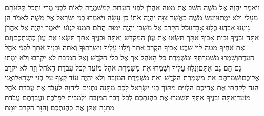 \documentclass[../main/main.tex]{subfiles}
\begin{document}
\begin{multicols*}{\ncols}
וַיֹּאמֶר יַהְוֶה אֶל מֹשֶׁה הָשֵׁב אֶת מַטֵּה אַהֲרֹן לִפְנֵי הָעֵדוּת לְמִשְׁמֶרֶת לְאוֹת לִבְנֵי מֶרִי וּתְכַל תְּלוּנֹּתָם מֵעָלַי וְלֹא יָמֻתוּ\PreVerseSpace{}וַיַּעַשׂ מֹשֶׁה כַּאֲשֶׁר צִוָּה יַהְוֶה אֹתוֹ כֵּן עָשָׂה \ClosedSection{}וַיֹּאמְרוּ בְּנֵי יִשְׂרָאֵל אֶל מֹשֶׁה לֵאמֹר הֵן גָּוַעְנוּ אָבַדְנוּ כֻּלָּנוּ אָבָדְנוּ\PreVerseSpace{}כֹּל הַקָּרֵב  אֶל מִשְׁכַּן יַהְוֶה יָמוּת הֲתֹם\SubEnd{} תַּמְנוּ לִגְוֺעַ \ClosedSection{}וַיֹּאמֶר יַהְוֶה אֶל אַהֲרֹן אַתָּה וּבָנֶיךָ וּבֵית אָבִיךָ אִתָּךְ תִּשְׂאוּ אֶת עֲוֺן הַמִּקְדָּשׁ וְאַתָּה וּבָנֶיךָ אִתָּךְ תִּשְׂאוּ אֶת עֲוֺן כְּהֻנַּתְכֶם\PreVerseSpace{}וְגַם אֶת אַחֶיךָ מַטֵּה לֵוִי שֵׁבֶט אָבִיךָ הַקְרֵב אִתָּךְ וְיִלָּווּ עָלֶיךָ וִישָׁרְתוּךָ וְאַתָּה וּבָנֶיךָ אִתָּךְ לִפְנֵי אֹהֶל הָעֵדֻת\PreVerseSpace{}וְשָׁמְרוּ מִשְׁמַרְתְּךָ וּמִשְׁמֶרֶת כָּל הָאֹהֶל אַךְ אֶל כְּלֵי הַקֹּדֶשׁ וְאֶל הַמִּזְבֵּחַ לֹא יִקְרָבוּ וְלֹא יָמֻתוּ גַם הֵם גַּם אַתֶּם\PreVerseSpace{}וְנִלְווּ עָלֶיךָ וְשָׁמְרוּ אֶת מִשְׁמֶרֶת אֹהֶל מוֹעֵד לְכֹל עֲבֹדַת הָאֹהֶל וְזָר לֹא יִקְרַב אֲלֵיכֶם\PreVerseSpace{}וּשְׁמַרְתֶּם אֵת מִשְׁמֶרֶת הַקֹּדֶשׁ וְאֵת מִשְׁמֶרֶת הַמִּזְבֵּחַ וְלֹא יִהְיֶה עוֹד קֶצֶף עַל בְּנֵי יִשְׂרָאֵל\PreVerseSpace{}וַאֲנִי הִנֵּה לָקַחְתִּי אֶת אֲחֵיכֶם הַלְוִיִּם מִתּוֹךְ בְּנֵי יִשְׂרָאֵל לָכֶם מַתָּנָה נְתֻנִים לַיהוָה לַעֲבֹד אֶת עֲבֹדַת אֹהֶל מוֹעֵד\PreVerseSpace{}וְאַתָּה וּבָנֶיךָ אִתְּךָ תִּשְׁמְרוּ אֶת כְּהֻנַּתְכֶם לְכָל דְּבַר הַמִּזְבֵּחַ וּלְמִבֵּית לַפָּרֹכֶת וַעֲבַדְתֶּם עֲבֹדַת מַתָּנָה אֶתֵּן אֶת כְּהֻנַּתְכֶם וְהַזָּר הַקָּרֵב יוּמָת\OpenSection{}\par

\end{multicols*}
\end{document}
